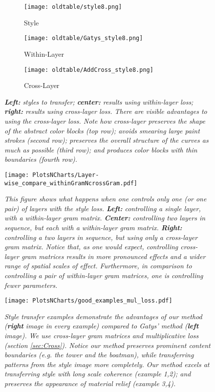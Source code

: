 \documentclass[runningheads]{llncs}
\begin{document}
\begin{figure}[!htbp]
  \begin{subfigure}[b]{0.3\linewidth}
    \texttt{[image: oldtable/style8.png]}
\caption{Style}
  \end{subfigure}
  \begin{subfigure}[b]{0.3\linewidth}
    \texttt{[image: oldtable/Gatys\_style8.png]}
\caption{Within-Layer}
  \end{subfigure}
  \begin{subfigure}[b]{0.3\linewidth}
    \texttt{[image: oldtable/AddCross\_style8.png]}
\caption{Cross-Layer}
  \end{subfigure} 
    \caption{\em {\bf Left:} styles to transfer; {\bf center:} results using within-layer
    loss; {\bf right:} results using cross-layer loss.  There are
    visible advantages to using the cross-layer loss. Note how cross-layer preserves the shape of the abstract color blocks (top row); 
avoids smearing large paint strokes (second row); preserves the overall structure of the curves as much as possible
(third row); and produces color blocks with thin boundaries (fourth row).
  }\label{fig:cf2}
\end{figure}

\begin{figure}[h]
\centering
\texttt{[image: PlotsNCharts/Layer-wise\_compare\_withinGramNcrossGram.pdf]}


\caption{\em This figure shows what happens when one controls only one (or one pair) of layers with the style loss.
{\bf Left:} controlling a single layer, with a within-layer gram matrix.  {\bf Center:} controlling two
layers in sequence, but each with a within-layer gram matrix.  {\bf Right:} controlling a two layers
in sequence, but using only a cross-layer gram matrix.  Notice that, as one would expect, controlling
cross-layer gram matrices results in more pronounced effects and a wider range of spatial scales of effect.
Furthermore, in comparison to controlling  a pair of within-layer gram matrices, one is controlling fewer
parameters.}
\label{fig:layer_wise}
\end{figure}


\begin{figure*}[!h]
\centering
\texttt{[image: PlotsNCharts/good\_examples\_mul\_loss.pdf]}
\caption{\em {} Style transfer examples demonstrate the advantages of our method (\textbf{right} image in every example) compared to Gatys' method \cite{gatys2016image} (\textbf{left} image). 
We use cross-layer gram matrices and multiplicative loss (section \ref{sec:Cross}). Notice our method preserves prominent content boundaries (e.g. the tower and the boatman), while transferring patterns from the style image more completely. Our method excels at transferring style with long scale coherence (example 1,2); and preserves the appearance of material relief (example 3,4).}
\label{fig:mulloss_comp}
\end{figure*}
\end{document}
